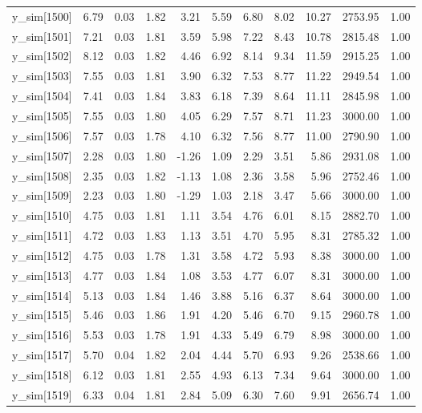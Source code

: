 \begin{table}[ht]
\begin{tabular}{rrrrrrrrrrr}
  y\_sim[1500] & 6.79 & 0.03 & 1.82 & 3.21 & 5.59 & 6.80 & 8.02 & 10.27 & 2753.95 & 1.00 \\ 
  y\_sim[1501] & 7.21 & 0.03 & 1.81 & 3.59 & 5.98 & 7.22 & 8.43 & 10.78 & 2815.48 & 1.00 \\ 
  y\_sim[1502] & 8.12 & 0.03 & 1.82 & 4.46 & 6.92 & 8.14 & 9.34 & 11.59 & 2915.25 & 1.00 \\ 
  y\_sim[1503] & 7.55 & 0.03 & 1.81 & 3.90 & 6.32 & 7.53 & 8.77 & 11.22 & 2949.54 & 1.00 \\ 
  y\_sim[1504] & 7.41 & 0.03 & 1.84 & 3.83 & 6.18 & 7.39 & 8.64 & 11.11 & 2845.98 & 1.00 \\ 
  y\_sim[1505] & 7.55 & 0.03 & 1.80 & 4.05 & 6.29 & 7.57 & 8.71 & 11.23 & 3000.00 & 1.00 \\ 
  y\_sim[1506] & 7.57 & 0.03 & 1.78 & 4.10 & 6.32 & 7.56 & 8.77 & 11.00 & 2790.90 & 1.00 \\ 
  y\_sim[1507] & 2.28 & 0.03 & 1.80 & -1.26 & 1.09 & 2.29 & 3.51 & 5.86 & 2931.08 & 1.00 \\ 
  y\_sim[1508] & 2.35 & 0.03 & 1.82 & -1.13 & 1.08 & 2.36 & 3.58 & 5.96 & 2752.46 & 1.00 \\ 
  y\_sim[1509] & 2.23 & 0.03 & 1.80 & -1.29 & 1.03 & 2.18 & 3.47 & 5.66 & 3000.00 & 1.00 \\ 
  y\_sim[1510] & 4.75 & 0.03 & 1.81 & 1.11 & 3.54 & 4.76 & 6.01 & 8.15 & 2882.70 & 1.00 \\ 
  y\_sim[1511] & 4.72 & 0.03 & 1.83 & 1.13 & 3.51 & 4.70 & 5.95 & 8.31 & 2785.32 & 1.00 \\ 
  y\_sim[1512] & 4.75 & 0.03 & 1.78 & 1.31 & 3.58 & 4.72 & 5.93 & 8.38 & 3000.00 & 1.00 \\ 
  y\_sim[1513] & 4.77 & 0.03 & 1.84 & 1.08 & 3.53 & 4.77 & 6.07 & 8.31 & 3000.00 & 1.00 \\ 
  y\_sim[1514] & 5.13 & 0.03 & 1.84 & 1.46 & 3.88 & 5.16 & 6.37 & 8.64 & 3000.00 & 1.00 \\ 
  y\_sim[1515] & 5.46 & 0.03 & 1.86 & 1.91 & 4.20 & 5.46 & 6.70 & 9.15 & 2960.78 & 1.00 \\ 
  y\_sim[1516] & 5.53 & 0.03 & 1.78 & 1.91 & 4.33 & 5.49 & 6.79 & 8.98 & 3000.00 & 1.00 \\ 
  y\_sim[1517] & 5.70 & 0.04 & 1.82 & 2.04 & 4.44 & 5.70 & 6.93 & 9.26 & 2538.66 & 1.00 \\ 
  y\_sim[1518] & 6.12 & 0.03 & 1.81 & 2.55 & 4.93 & 6.13 & 7.34 & 9.64 & 3000.00 & 1.00 \\ 
  y\_sim[1519] & 6.33 & 0.04 & 1.81 & 2.84 & 5.09 & 6.30 & 7.60 & 9.91 & 2656.74 & 1.00 \\ 

\end{tabular}
\end{table}
